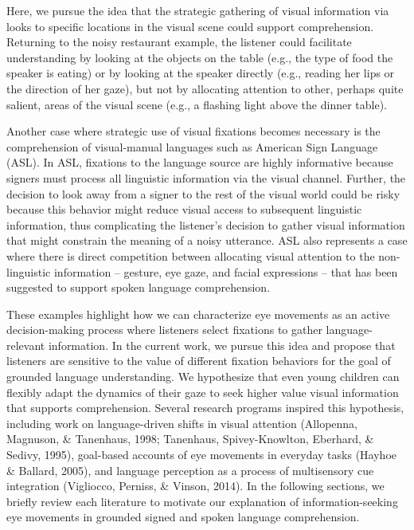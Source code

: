 \documentclass[,man,floatsintext]{apa6}
\begin{document}
Here, we pursue the idea that the strategic gathering of visual
information via looks to specific locations in the visual scene could
support comprehension. Returning to the noisy restaurant example, the
listener could facilitate understanding by looking at the objects on the
table (e.g., the type of food the speaker is eating) or by looking at
the speaker directly (e.g., reading her lips or the direction of her
gaze), but not by allocating attention to other, perhaps quite salient,
areas of the visual scene (e.g., a flashing light above the dinner
table).

Another case where strategic use of visual fixations becomes necessary
is the comprehension of visual-manual languages such as American Sign
Language (ASL). In ASL, fixations to the language source are highly
informative because signers must process all linguistic information via
the visual channel. Further, the decision to look away from a signer to
the rest of the visual world could be risky because this behavior might
reduce visual access to subsequent linguistic information, thus
complicating the listener's decision to gather visual information that
might constrain the meaning of a noisy utterance. ASL also represents a
case where there is direct competition between allocating visual
attention to the non-linguistic information -- gesture, eye gaze, and
facial expressions -- that has been suggested to support spoken language
comprehension.

These examples highlight how we can characterize eye movements as an
active decision-making process where listeners select fixations to
gather language-relevant information. In the current work, we pursue
this idea and propose that listeners are sensitive to the value of
different fixation behaviors for the goal of grounded language
understanding. We hypothesize that even young children can flexibly
adapt the dynamics of their gaze to seek higher value visual information
that supports comprehension. Several research programs inspired this
hypothesis, including work on language-driven shifts in visual attention
(Allopenna, Magnuson, \& Tanenhaus, 1998; Tanenhaus, Spivey-Knowlton,
Eberhard, \& Sedivy, 1995), goal-based accounts of eye movements in
everyday tasks (Hayhoe \& Ballard, 2005), and language perception as a
process of multisensory cue integration (Vigliocco, Perniss, \& Vinson,
2014). In the following sections, we briefly review each literature to
motivate our explanation of information-seeking eye movements in
grounded signed and spoken language comprehension.
\end{document}
